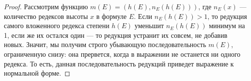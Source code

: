 \begin{proof}
Рассмотрим функцию $m(E) = (h(E), n_E(h(E)))$, где $n_E(x)$ --- количество
редексов высоты $x$ в формуле $E$. Если $n_E(h(E)) > 1$, то редукция самого вложенного редекса 
степени $h(E)$ уменьшит $n_E(h(E))$ минимум на 1, если же их остался один --- то
редукция устранит их совсем, не добавив новых. 
Значит, мы получим строго убывающую последовательность $m(E)$, ограниченную снизу: она
прервется, когда в выражении не останется ни одного редекса. То есть, данная последовательность
редукций приведет выражение к нормальной форме.

\end{proof}